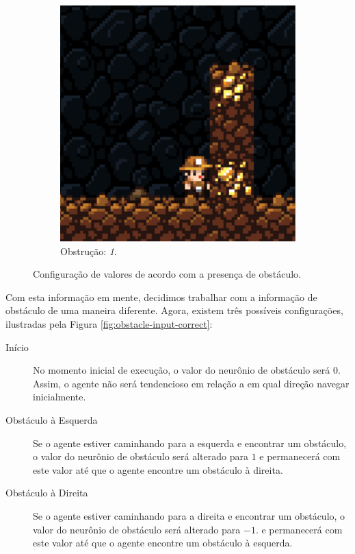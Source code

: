 \begin{figure}[H]
\begin{subfigure}[b]{0.2\textwidth}
        \includegraphics[width=\textwidth]{fig/obstacle.pdf}
        \caption{Obstrução: \textit{1}.}
	\end{subfigure}
    \caption{Configuração de valores de acordo com a presença de obstáculo.}
	\label{fig:obstacle-input-wrong}
\end{figure}

Com esta informação em mente, decidimos trabalhar com a informação de obstáculo
de uma maneira diferente. Agora, existem três possíveis configurações,
ilustradas pela Figura \ref{fig:obstacle-input-correct}:

\begin{description}
	\item[Início]
		No momento inicial de execução, o valor do neurônio de obstáculo será
		$0$. Assim, o agente não será tendencioso em relação a em qual direção
		navegar inicialmente.

	\item[Obstáculo à Esquerda]
		Se o agente estiver caminhando para a esquerda e encontrar um obstáculo,
		o valor do neurônio de obstáculo será alterado para $1$ e permanecerá
		com este valor até que o agente encontre um obstáculo à direita.

	\item[Obstáculo à Direita]
		Se o agente estiver caminhando para a direita e encontrar um obstáculo,
		o valor do neurônio de obstáculo será alterado para $-1$. e permanecerá
		com este valor até que o agente encontre um obstáculo à esquerda.
\end{description}

